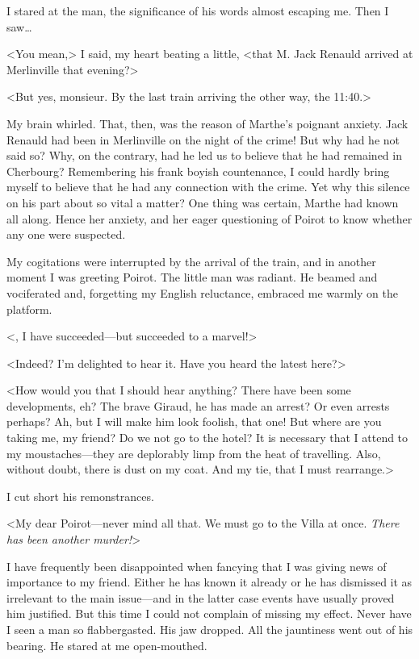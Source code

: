  I stared at the man, the significance of his words almost escaping me. Then I saw\dots 

 <You mean,> I said, my heart beating a little, <that M. Jack Renauld arrived at Merlinville that evening?> 

 <But yes, monsieur. By the last train arriving the other way, the 11:40.> 

 My brain whirled. That, then, was the reason of Marthe's poignant anxiety. Jack Renauld had been in Merlinville on the night of the crime! But why had he not said so? Why, on the contrary, had he led us to believe that he had remained in Cherbourg? Remembering his frank boyish countenance, I could hardly bring myself to believe that he had any connection with the crime. Yet why this silence on his part about so vital a matter? One thing was certain, Marthe had known all along. Hence her anxiety, and her eager questioning of Poirot to know whether any one were suspected. 

 My cogitations were interrupted by the arrival of the train, and in another moment I was greeting Poirot. The little man was radiant. He beamed and vociferated and, forgetting my English reluctance, embraced me warmly on the platform. 

 <, I have succeeded—but succeeded to a marvel!> 

 <Indeed? I'm delighted to hear it. Have you heard the latest here?> 

 <How would you that I should hear anything? There have been some developments, eh? The brave Giraud, he has made an arrest? Or even arrests perhaps? Ah, but I will make him look foolish, that one! But where are you taking me, my friend? Do we not go to the hotel? It is necessary that I attend to my moustaches—they are deplorably limp from the heat of travelling. Also, without doubt, there is dust on my coat. And my tie, that I must rearrange.> 

 I cut short his remonstrances. 

 <My dear Poirot—never mind all that. We must go to the Villa at once. \emph{There has been another murder!}> 

 I have frequently been disappointed when fancying that I was giving news of importance to my friend. Either he has known it already or he has dismissed it as irrelevant to the main issue—and in the latter case events have usually proved him justified. But this time I could not complain of missing my effect. Never have I seen a man so flabbergasted. His jaw dropped. All the jauntiness went out of his bearing. He stared at me open-mouthed. 


